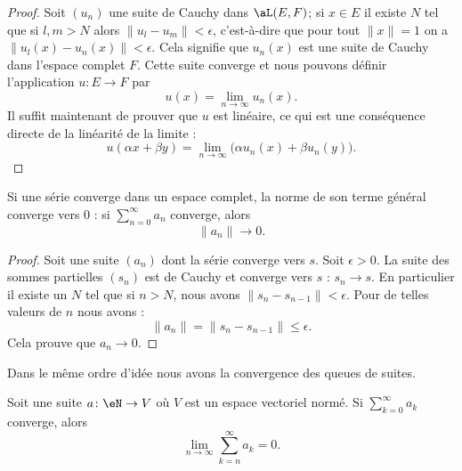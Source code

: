 \begin{proof}
	Soit \( (u_n)\) une suite de Cauchy dans \( \aL(E,F)\); si \( x\in E\) il existe \( N\) tel que si \( l,m>N\) alors \( \| u_l-u_m \|<\epsilon\), c'est-à-dire que pour tout \( \| x \|=1\) on a \( \| u_l(x)-u_n(x) \|<\epsilon\). Cela signifie que \( u_n(x)\) est une suite de Cauchy dans l'espace complet \( F\). Cette suite converge et nous pouvons définir l'application \( u\colon E\to F\) par
	\begin{equation}
		u(x)=\lim_{n\to \infty} u_n(x).
	\end{equation}
	Il suffit maintenant de prouver que \( u\) est linéaire, ce qui est une conséquence directe de la linéarité de la limite :
	\begin{equation}
		u(\alpha x+\beta y)=\lim_{n\to \infty} \big( \alpha u_n(x)+\beta u_n(y) \big).
	\end{equation}
\end{proof}

\begin{proposition}  \label{PROPooYDFUooTGnYQg}
	Si une série converge dans un espace complet, la norme de son terme général converge vers \( 0\) : si \( \sum_{n=0}^{\infty}a_n\) converge, alors
	\begin{equation}
		\| a_n \|\to 0.
	\end{equation}
\end{proposition}

\begin{proof}
	Soit une suite \( (a_n)\) dont la série converge vers \( s\). Soit \( \epsilon>0\). La suite des sommes partielles \( (s_n)\) est de Cauchy et converge vers \( s\) : \( s_n\to s\). En particulier il existe un \( N\) tel que si \( n>N\), nous avons \( \| s_n-s_{n-1} \|<\epsilon\). Pour de telles valeurs de \( n\) nous avons :
	\begin{equation}
		\| a_n \|=\| s_n-s_{n-1} \|\leq \epsilon.
	\end{equation}
	Cela prouve que \( a_n\to 0\).
\end{proof}

Dans le même ordre d'idée nous avons la convergence des queues de suites.

\begin{lemma}       \label{LEMooFUCOooCOqLRj}
	Soit une suite \( a\colon \eN\to V\) où \( V\) est un espace vectoriel normé. Si \( \sum_{k=0}^{\infty}a_k\) converge, alors
	\begin{equation}
		\lim_{n\to \infty} \sum_{k=n}^{\infty}a_k=0.
	\end{equation}
\end{lemma}

